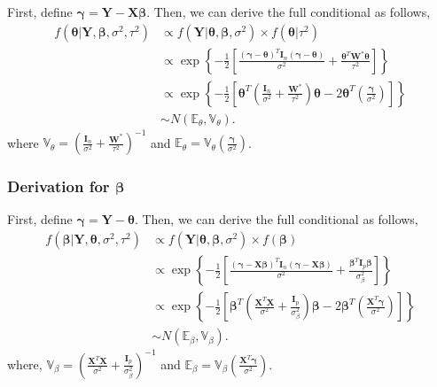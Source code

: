 \documentclass[12pt]{article} %
\theoremstyle{plain}
\theoremstyle{definition}
\theoremstyle{remark}
\begin{document}
First, define $\boldsymbol{\gamma}=\mathbf{Y}-\mathbf{X}\boldsymbol{\beta}$. Then, we can derive the full conditional as follows,
\begin{align*}
f\left(\boldsymbol{\theta}|\mathbf{Y},\boldsymbol{\beta},\sigma^2,\tau^2\right) &\propto f\left(\mathbf{Y}|\boldsymbol{\theta},\boldsymbol{\beta},\sigma^2\right) \times f(\boldsymbol{\theta}|\tau^2)\\
&\propto \exp\left\{-\frac{1}{2}\left[\frac{\left(\boldsymbol{\gamma}-\boldsymbol{\theta}\right)^T\mathbf{I}_n\left(\boldsymbol{\gamma}-\boldsymbol{\theta}\right)}{\sigma^2}+\frac{\boldsymbol{\theta}^T \mathbf{W}^*\boldsymbol{\theta}}{\tau^2} \right] \right\}\\
&\propto \exp\left\{-\frac{1}{2}\left[\boldsymbol{\theta}^T\left(\frac{\mathbf{I}_n}{\sigma^2}+\frac{\mathbf{W}^*}{\tau^2}\right)\boldsymbol{\theta}-2\boldsymbol{\theta}^T \left(\frac{ \boldsymbol{\gamma}}{\sigma^2}\right) \right] \right\}\\
&\sim N(\mathbb{E}_{\theta},\mathbb{V}_{\theta}).
\end{align*}
where $\mathbb{V}_{\theta}=\left(\frac{\mathbf{I}_n}{\sigma^2}+\frac{\mathbf{W}^*}{\tau^2}\right)^{-1}$ and $\mathbb{E}_{\theta}=\mathbb{V}_{\theta}\left(\frac{ \boldsymbol{\gamma}}{\sigma^2}\right)$.\\

\subsubsection*{Derivation for $\boldsymbol{\beta}$}

First, define $\boldsymbol{\gamma}=\mathbf{Y}-\boldsymbol{\theta}$. Then, we can derive the full conditional as follows,
\begin{align*}
f\left(\boldsymbol{\beta}|\mathbf{Y},\boldsymbol{\theta},\sigma^2,\tau^2\right) &\propto f\left(\mathbf{Y}|\boldsymbol{\theta},\boldsymbol{\beta},\sigma^2\right) \times f(\boldsymbol{\beta})\\
&\propto \exp\left\{-\frac{1}{2}\left[\frac{\left(\boldsymbol{\gamma}-\mathbf{X}\boldsymbol{\beta}\right)^T\mathbf{I}_n\left(\boldsymbol{\gamma}-\mathbf{X}\boldsymbol{\beta}\right)}{\sigma^2}+\frac{\boldsymbol{\beta}^T \mathbf{I}_p\boldsymbol{\beta}}{\sigma_{\beta}^2} \right] \right\}\\
&\propto \exp\left\{-\frac{1}{2}\left[\boldsymbol{\beta}^T\left(\frac{\mathbf{X}^T\mathbf{X}}{\sigma^2}+\frac{\mathbf{I}_p}{\sigma_{\beta}^2}\right)\boldsymbol{\beta}-2\boldsymbol{\beta}^T \left(\frac{\mathbf{X}^T\boldsymbol{\gamma}}{\sigma^2}\right) \right] \right\}\\
&\sim N(\mathbb{E}_{\beta},\mathbb{V}_{\beta}).
\end{align*}
where, $\mathbb{V}_{\beta}=\left(\frac{\mathbf{X}^T\mathbf{X}}{\sigma^2}+\frac{\mathbf{I}_p}{\sigma_{\beta}^2}\right)^{-1}$ and $\mathbb{E}_{\beta}=\mathbb{V}_{\beta}\left(\frac{\mathbf{X}^T\boldsymbol{\gamma}}{\sigma^2}\right)$.\\
\end{document}
